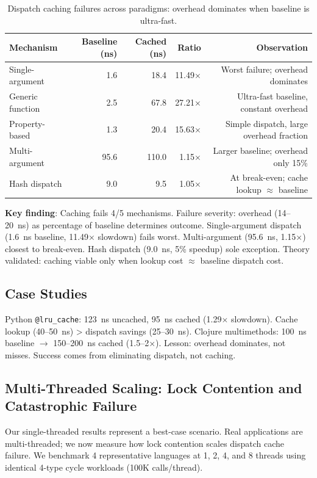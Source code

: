 \documentclass[sigplan,final,acmsmall,review,screen]{acmart}
\begin{document}
\begin{table}[h!]
\centering
\small
\caption{Dispatch caching failures across paradigms: overhead dominates when baseline is ultra-fast.}
\label{tab:dispatch-mechanisms}
\begin{tabular}{@{}lrrrr@{}}
\toprule
\textbf{Mechanism} & \textbf{Baseline (ns)} & \textbf{Cached (ns)} & \textbf{Ratio} & \textbf{Observation} \\
\midrule
Single-argument & 1.6 & 18.4 & 11.49× & Worst failure; overhead dominates \\
Generic function & 2.5 & 67.8 & 27.21× & Ultra-fast baseline, constant overhead \\
Property-based & 1.3 & 20.4 & 15.63× & Simple dispatch, large overhead fraction \\
Multi-argument & 95.6 & 110.0 & 1.15× & Larger baseline; overhead only 15\% \\
Hash dispatch & 9.0 & 9.5 & 1.05× & At break-even; cache lookup $\approx$ baseline \\
\midrule
\end{tabular}
\end{table}

\textbf{Key finding}: Caching fails 4/5 mechanisms. Failure severity: overhead (14--20~ns) as percentage of baseline determines outcome. Single-argument dispatch (1.6~ns baseline, 11.49× slowdown) fails worst. Multi-argument (95.6~ns, 1.15×) closest to break-even. Hash dispatch (9.0~ns, 5\% speedup) sole exception. Theory validated: caching viable only when lookup cost $\approx$ baseline dispatch cost.

\subsection{Case Studies}
\label{sec:case-studies}

Python \texttt{@lru\_cache}: 123~ns uncached, 95~ns cached (1.29$\times$ slowdown). Cache lookup (40--50~ns) > dispatch savings (25--30~ns). Clojure multimethods: 100~ns baseline $\to$ 150--200~ns cached (1.5--2$\times$). Lesson: overhead dominates, not misses. Success comes from eliminating dispatch, not caching.


\subsection{Multi-Threaded Scaling: Lock Contention and Catastrophic Failure}
\label{sec:multi-threading}

Our single-threaded results represent a best-case scenario. Real applications are multi-threaded; we now measure how lock contention scales dispatch cache failure.
We benchmark 4 representative languages at 1, 2, 4, and 8 threads using identical 4-type cycle workloads (100K calls/thread).
\end{document}
